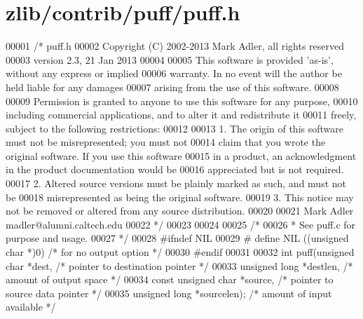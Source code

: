 \hypertarget{zlib_2contrib_2puff_2puff_8h_source}{}\section{zlib/contrib/puff/puff.h}
\label{zlib_2contrib_2puff_2puff_8h_source}

\begin{DoxyCode}
00001 \textcolor{comment}{/* puff.h}
00002 \textcolor{comment}{  Copyright (C) 2002-2013 Mark Adler, all rights reserved}
00003 \textcolor{comment}{  version 2.3, 21 Jan 2013}
00004 \textcolor{comment}{}
00005 \textcolor{comment}{  This software is provided 'as-is', without any express or implied}
00006 \textcolor{comment}{  warranty.  In no event will the author be held liable for any damages}
00007 \textcolor{comment}{  arising from the use of this software.}
00008 \textcolor{comment}{}
00009 \textcolor{comment}{  Permission is granted to anyone to use this software for any purpose,}
00010 \textcolor{comment}{  including commercial applications, and to alter it and redistribute it}
00011 \textcolor{comment}{  freely, subject to the following restrictions:}
00012 \textcolor{comment}{}
00013 \textcolor{comment}{  1. The origin of this software must not be misrepresented; you must not}
00014 \textcolor{comment}{     claim that you wrote the original software. If you use this software}
00015 \textcolor{comment}{     in a product, an acknowledgment in the product documentation would be}
00016 \textcolor{comment}{     appreciated but is not required.}
00017 \textcolor{comment}{  2. Altered source versions must be plainly marked as such, and must not be}
00018 \textcolor{comment}{     misrepresented as being the original software.}
00019 \textcolor{comment}{  3. This notice may not be removed or altered from any source distribution.}
00020 \textcolor{comment}{}
00021 \textcolor{comment}{  Mark Adler    madler@alumni.caltech.edu}
00022 \textcolor{comment}{ */}
00023 
00024 
00025 \textcolor{comment}{/*}
00026 \textcolor{comment}{ * See puff.c for purpose and usage.}
00027 \textcolor{comment}{ */}
00028 \textcolor{preprocessor}{#ifndef NIL}
00029 \textcolor{preprocessor}{#  define NIL ((unsigned char *)0)      }\textcolor{comment}{/* for no output option */}\textcolor{preprocessor}{}
00030 \textcolor{preprocessor}{#endif}
00031 
00032 \textcolor{keywordtype}{int} puff(\textcolor{keywordtype}{unsigned} \textcolor{keywordtype}{char} *dest,           \textcolor{comment}{/* pointer to destination pointer */}
00033          \textcolor{keywordtype}{unsigned} \textcolor{keywordtype}{long} *destlen,        \textcolor{comment}{/* amount of output space */}
00034          \textcolor{keyword}{const} \textcolor{keywordtype}{unsigned} \textcolor{keywordtype}{char} *source,   \textcolor{comment}{/* pointer to source data pointer */}
00035          \textcolor{keywordtype}{unsigned} \textcolor{keywordtype}{long} *sourcelen);     \textcolor{comment}{/* amount of input available */}
\end{DoxyCode}
